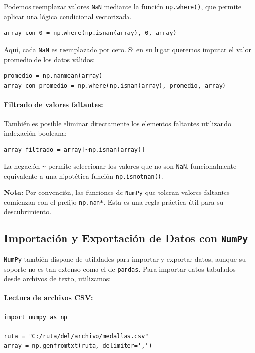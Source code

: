 \documentclass{article}
\theoremstyle{nonumberplain}
\begin{document}
Podemos reemplazar valores \texttt{NaN} mediante la función \texttt{np.where()}, que permite aplicar una lógica condicional vectorizada.

\begin{verbatim}
array_con_0 = np.where(np.isnan(array), 0, array)
\end{verbatim}

Aquí, cada \texttt{NaN} es reemplazado por cero. Si en su lugar queremos imputar el valor promedio de los datos válidos:

\begin{verbatim}
promedio = np.nanmean(array)
array_con_promedio = np.where(np.isnan(array), promedio, array)
\end{verbatim}

\paragraph{Filtrado de valores faltantes:}

También es posible eliminar directamente los elementos faltantes utilizando indexación booleana:

\begin{verbatim}
array_filtrado = array[~np.isnan(array)]
\end{verbatim}

La negación \texttt{\textasciitilde{}} permite seleccionar los valores que no son \texttt{NaN}, funcionalmente equivalente a una hipotética función \texttt{np.isnotnan()}.

\textbf{Nota:} Por convención, las funciones de \texttt{NumPy} que toleran valores faltantes comienzan con el prefijo \texttt{np.nan*}. Esta es una regla práctica útil para su descubrimiento.

\subsection*{Importación y Exportación de Datos con \texttt{NumPy}}

\texttt{NumPy} también dispone de utilidades para importar y exportar datos, aunque su soporte no es tan extenso como el de \texttt{pandas}. Para importar datos tabulados desde archivos de texto, utilizamos:

\paragraph{Lectura de archivos CSV:}

\begin{verbatim}
import numpy as np

ruta = "C:/ruta/del/archivo/medallas.csv"
array = np.genfromtxt(ruta, delimiter=',')
\end{verbatim}
\end{document}
